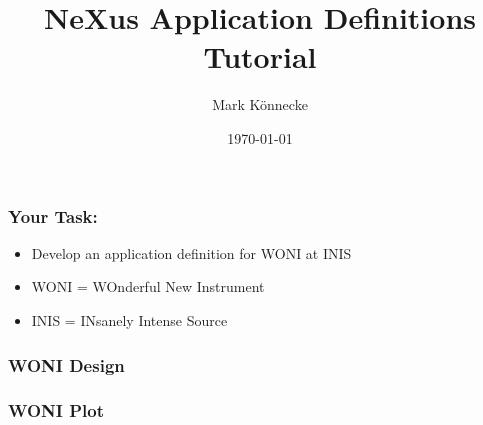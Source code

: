 \documentclass{beamer}
\title{NeXus Application Definitions Tutorial}
\author{Mark K\"onnecke }
\institute{Paul Scherrer Institute\\Switzerland }
\date{\today}
\begin{document}
\begin{frame}
\titlepage
\end{frame}

\begin{frame}
\frametitle{Your Task:}
\begin{itemize}
\item Develop an application definition for WONI at INIS
\item WONI = WOnderful New Instrument
\item INIS = INsanely Intense Source
\end{itemize}
\end{frame}


\begin{frame} \frametitle{WONI Design}
\begin{figure}[!ht]
\end{figure}
\end{frame}

\begin{frame} \frametitle{WONI Plot}
\begin{figure}[!ht]
\end{figure}
\end{frame}
\end{document}
